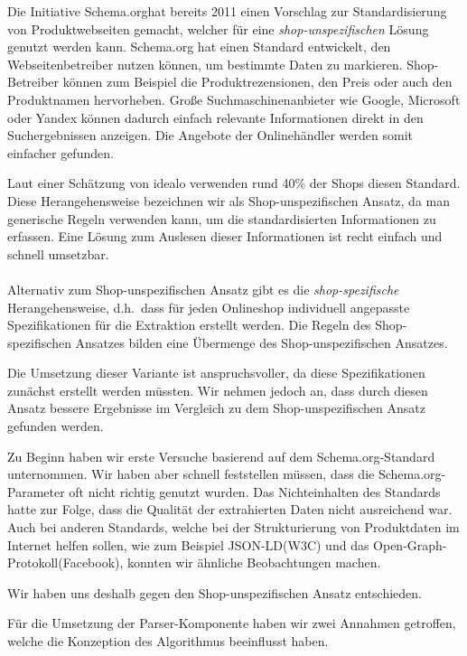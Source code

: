 Die Initiative Schema.org\footnotemark hat bereits 2011 einen Vorschlag zur Standardisierung von Produktwebseiten
gemacht, welcher für eine \textit{shop-unspezifischen} Lösung genutzt werden kann.
Schema.org hat einen Standard entwickelt, den Webseitenbetreiber nutzen können, um bestimmte Daten zu markieren.
Shop-Betreiber können zum Beispiel die Produktrezensionen, den Preis oder auch den Produktnamen hervorheben.
Große Suchmaschinenanbieter wie Google, Microsoft oder Yandex können dadurch einfach relevante Informationen
direkt in den Suchergebnissen anzeigen.
Die Angebote der Onlinehändler werden somit einfacher gefunden.

Laut einer Schätzung von idealo verwenden rund 40\% der Shops diesen Standard.
Diese Herangehensweise bezeichnen wir als Shop-unspezifischen Ansatz, da man generische Regeln verwenden kann,
um die standardisierten Informationen zu erfassen.
Eine Lösung zum Auslesen dieser Informationen ist recht einfach und schnell umsetzbar.
\\
~\\
Alternativ zum Shop-unspezifischen Ansatz gibt es die \textit{shop-spezifische} Herangehensweise, d.h.\ dass für jeden
Onlineshop individuell angepasste Spezifikationen für die Extraktion erstellt werden.
Die Regeln des Shop-spezifischen Ansatzes bilden eine Übermenge des Shop-unspezifischen Ansatzes.

Die Umsetzung dieser Variante ist anspruchsvoller, da diese Spezifikationen zunächst erstellt werden müssten.
Wir nehmen jedoch an, dass durch diesen Ansatz bessere Ergebnisse im Vergleich zu dem Shop-unspezifischen Ansatz
gefunden werden.

Zu Beginn haben wir erste Versuche basierend auf dem Schema.org-Standard unternommen.
Wir haben aber schnell feststellen müssen, dass die Schema.org-Parameter oft nicht richtig genutzt wurden.
Das Nichteinhalten des Standards hatte zur Folge, dass die Qualität der extrahierten Daten nicht ausreichend war.
Auch bei anderen Standards, welche bei der Strukturierung von Produktdaten im Internet helfen sollen, wie zum Beispiel
JSON-LD\footnotemark (W3C) und das Open-Graph-Protokoll\footnotemark (Facebook), konnten wir ähnliche Beobachtungen
machen.

Wir haben uns deshalb gegen den Shop-unspezifischen Ansatz entschieden.

Für die Umsetzung der Parser-Komponente haben wir zwei Annahmen getroffen, welche die Konzeption des Algorithmus
beeinflusst haben.

